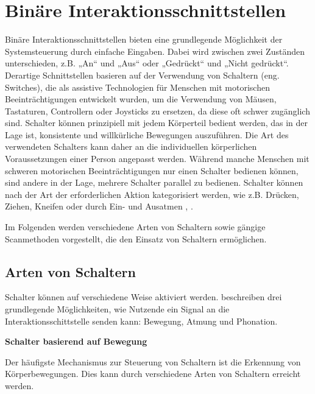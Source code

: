 \section{Binäre Interaktionsschnittstellen}

Binäre Interaktionsschnittstellen bieten eine grundlegende Möglichkeit der Systemsteuerung durch einfache Eingaben. Dabei wird zwischen zwei Zuständen unterschieden, z.B. „An“ und „Aus“ oder „Gedrückt“ und „Nicht gedrückt“. Derartige Schnittstellen basieren auf der Verwendung von Schaltern (eng. Switches), die als assistive Technologien für Menschen mit motorischen Beeinträchtigungen entwickelt wurden, um die Verwendung von Mäusen, Tastaturen, Controllern oder Joysticks zu ersetzen, da diese oft schwer zugänglich sind. Schalter können prinzipiell mit jedem Körperteil bedient werden, das in der Lage ist, konsistente und willkürliche Bewegungen auszuführen. Die Art des verwendeten Schalters kann daher an die individuellen körperlichen Voraussetzungen einer Person angepasst werden. Während manche Menschen mit schweren motorischen Beeinträchtigungen nur einen Schalter bedienen können, sind andere in der Lage, mehrere Schalter parallel zu bedienen. Schalter können nach der Art der erforderlichen Aktion kategorisiert werden, wie z.B. Drücken, Ziehen, Kneifen oder durch Ein- und Ausatmen \citep{yuan_game_2011}, \citep{Weber22111996}. 

Im Folgenden werden verschiedene Arten von Schaltern sowie gängige Scanmethoden vorgestellt, die den Einsatz von Schaltern ermöglichen.

\subsection{Arten von Schaltern}

Schalter können auf verschiedene Weise aktiviert werden. \cite{COOK2015117} beschreiben drei grundlegende Möglichkeiten, wie Nutzende ein Signal an die Interaktionsschittstelle senden kann: Bewegung, Atmung und Phonation.

\textbf{Schalter basierend auf Bewegung}

Der häufigste Mechanismus zur Steuerung von Schaltern ist die Erkennung von Körperbewegungen. Dies kann durch verschiedene Arten von Schaltern erreicht werden.

